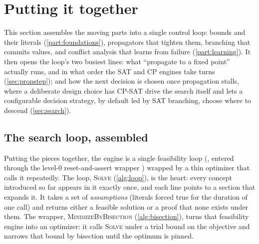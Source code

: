 \section{Putting it together}\label{part:together}

This section assembles the moving parts into a single control loop: bounds and
their literals (\cref{part:foundations}), propagators that tighten them, branching
that commits values, and conflict analysis that learns from failure
(\cref{part:learning}). It then opens the loop's two busiest lines: what
``propagate to a fixed point'' actually runs, and in what order the SAT and CP
engines take turns (\cref{sec:propstep}); and how the next decision is
chosen once propagation stalls, where a deliberate design choice has CP-SAT drive
the search itself and lets a configurable decision strategy, by default led by SAT
branching, choose where to descend (\cref{sec:search}).

\subsection{The search loop, assembled}\label{sec:loop}

Putting the pieces together, the engine is a single feasibility loop
(, entered through the
level-$0$ reset-and-assert wrapper
) wrapped by a
thin optimizer that calls it repeatedly. The loop, \textsc{Solve}
(\cref{alg:loop}), is the heart:
every concept introduced so far appears in it exactly once, and each line points to
a section that expands it. It takes a set of \emph{assumptions} (literals forced
true for the duration of one call) and returns either a feasible solution or a
proof that none exists under them. The wrapper,
\textsc{MinimizeByBisection} (\cref{alg:bisection}), turns that feasibility engine into an optimizer: it
calls \textsc{Solve} under a trial bound on the objective and narrows that bound by
bisection until the optimum is pinned.

